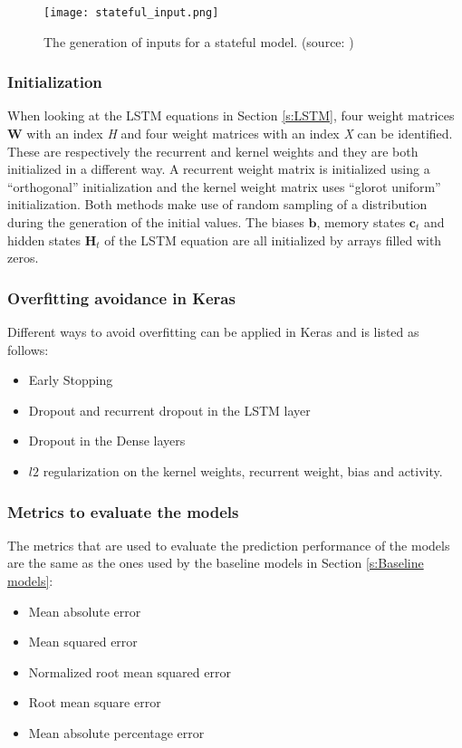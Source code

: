 \begin{figure}[h]
	\centering
	\texttt{[image: stateful\_input.png]}
	\caption{The generation of inputs for a stateful model. (source: \cite{FneishMo})}
	\label{fig:stateful_input}
\end{figure}

\subsubsection{Initialization}
When looking at the LSTM equations in Section \ref{s:LSTM}, four weight matrices $ \bm{W} $ with an index \textit{H} and four weight matrices with an index \textit{X} can be identified. These are respectively the recurrent and kernel weights and they are both initialized in a different way. A recurrent weight matrix is initialized using a ``orthogonal'' initialization and the kernel weight matrix uses ``glorot uniform'' initialization. Both methods make use of random sampling of a distribution  during the generation of the initial values. The biases $ \bm{b} $, memory states $ \bm{c}_t $ and hidden states $ \bm{H}_t $ of the LSTM equation are all initialized by arrays filled with zeros.\\


\subsubsection{Overfitting avoidance in Keras}
Different ways to avoid overfitting can be applied in Keras and is listed as follows:
\begin{itemize}
	\item Early Stopping
	\item Dropout and recurrent dropout in the LSTM layer
	\item Dropout in the Dense layers
	\item $ l2 $ regularization on the kernel weights, recurrent weight, bias and activity.
\end{itemize}

\subsubsection{Metrics to evaluate the models}
The metrics that are used to evaluate the prediction performance of the models are the same as the ones used by the baseline models in Section \ref{s:Baseline models}:
\begin{itemize}
	\item Mean absolute error
	\item Mean squared error
	\item Normalized root mean squared error
	\item Root mean square error
	\item Mean absolute percentage error
\end{itemize}

